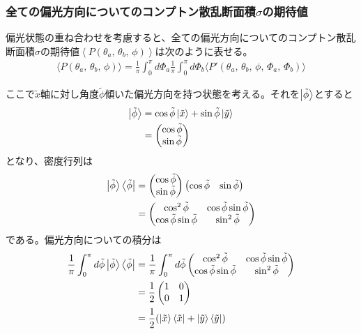 \documentclass[../../main.tex]{subfiles}
\numberwithin{equation}{section}
\numberwithin{table}{section}
\numberwithin{figure}{section}
\begin{document}
\subsubsection{全ての偏光方向についてのコンプトン散乱断面積$\sigma$の期待値}
偏光状態の重ね合わせを考慮すると、全ての偏光方向についてのコンプトン散乱断面積$\sigma$の期待値$\left\langle P (\theta_a,\, \theta_b,\, \phi) \right\rangle$は次のように表せる。
\begin{align}
	\langle P (\theta_a,\, \theta_b,\, \phi) \rangle
	= \frac{1}{\pi} \int_{0}^{\pi} d\Phi_a \frac{1}{\pi} \int_{0}^{\pi} d\Phi_b \langle P' (\theta_a,\, \theta_b,\, \phi,\, \Phi_a,\, \Phi_b) \rangle \label{eq:expected}
\end{align}

ここで$\tilde{x}$軸に対し角度$\tilde{\phi}$傾いた偏光方向を持つ状態を考える。それを$\ket{\tilde{\phi}}$とすると
\begin{align}
	\ket{\tilde{\phi}}
	&= \cos \tilde{\phi} \ket{\tilde{x}} + \sin \tilde{\phi} \ket{\tilde{y}} \notag \\
	&=
	\begin{pmatrix}
		\cos \tilde{\phi} \\
		\sin \tilde{\phi}
	\end{pmatrix}
\end{align}
となり、密度行列は
\begin{align}
	\ket{\tilde{\phi}} \bra{\tilde{\phi}} &= 
	\begin{pmatrix}
		\cos \tilde{\phi} \\
		\sin \tilde{\phi}
	\end{pmatrix}
	\begin{pmatrix}
		\cos \tilde{\phi} & \sin \tilde{\phi}
	\end{pmatrix} \notag \\
	&= 
	\begin{pmatrix}
		\cos^2 \tilde{\phi} & \cos \tilde{\phi} \sin \tilde{\phi} \\
		\cos \tilde{\phi} \sin \tilde{\phi} & \sin^2 \tilde{\phi}
	\end{pmatrix}
\end{align}
である。偏光方向についての積分は
\begin{align}
	\frac{1}{\pi} \int_{0}^{\pi} d\tilde{\phi} \ket{\tilde{\phi}} \bra{\tilde{\phi}}
	&= \frac{1}{\pi} \int_{0}^{\pi} d\tilde{\phi}
	\begin{pmatrix}
		\cos^2 \tilde{\phi} & \cos \tilde{\phi} \sin \tilde{\phi} \\
		\cos \tilde{\phi} \sin \tilde{\phi} & \sin^2 \tilde{\phi}
	\end{pmatrix} \notag \\
	&= \frac12 
	\begin{pmatrix}
		1 & 0 \\
		0 & 1
	\end{pmatrix} \notag \\
	&= \frac12 (\ket{\tilde{x}} \bra{\tilde{x}} + \ket{\tilde{y}} \bra{\tilde{y}})
\end{align}
\end{document}
